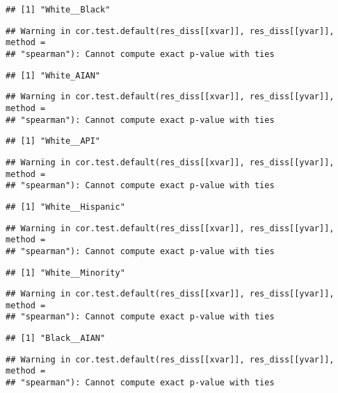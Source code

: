 \documentclass[
]{article}
\begin{document}
\begin{verbatim}
## [1] "White__Black"
\end{verbatim}

\begin{verbatim}
## Warning in cor.test.default(res_diss[[xvar]], res_diss[[yvar]], method =
## "spearman"): Cannot compute exact p-value with ties
\end{verbatim}

\begin{verbatim}
## [1] "White_AIAN"
\end{verbatim}

\begin{verbatim}
## Warning in cor.test.default(res_diss[[xvar]], res_diss[[yvar]], method =
## "spearman"): Cannot compute exact p-value with ties
\end{verbatim}

\begin{verbatim}
## [1] "White__API"
\end{verbatim}

\begin{verbatim}
## Warning in cor.test.default(res_diss[[xvar]], res_diss[[yvar]], method =
## "spearman"): Cannot compute exact p-value with ties
\end{verbatim}

\begin{verbatim}
## [1] "White__Hispanic"
\end{verbatim}

\begin{verbatim}
## Warning in cor.test.default(res_diss[[xvar]], res_diss[[yvar]], method =
## "spearman"): Cannot compute exact p-value with ties
\end{verbatim}

\begin{verbatim}
## [1] "White__Minority"
\end{verbatim}

\begin{verbatim}
## Warning in cor.test.default(res_diss[[xvar]], res_diss[[yvar]], method =
## "spearman"): Cannot compute exact p-value with ties
\end{verbatim}

\begin{verbatim}
## [1] "Black__AIAN"
\end{verbatim}

\begin{verbatim}
## Warning in cor.test.default(res_diss[[xvar]], res_diss[[yvar]], method =
## "spearman"): Cannot compute exact p-value with ties
\end{verbatim}
\end{document}
